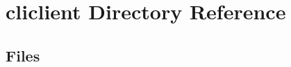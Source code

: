 \section{cliclient Directory Reference}
\label{dir_c1263394efa5843679ccd48bf9f10a20}
\subsection*{Files}
\begin{DoxyCompactItemize}
\end{DoxyCompactItemize}
